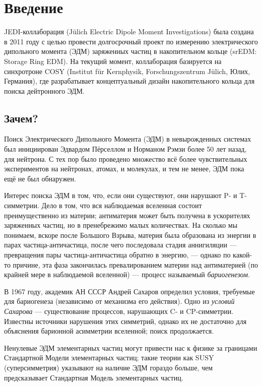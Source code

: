 \documentclass{extarticle}
\begin{document}


\tableofcontents
\pagebreak

\section*{Введение}
JEDI-коллаборация (J\"ulich Electric Dipole Moment Investigations) была создана в 2011 году с целью провести долгосрочный проект по измерению электрического дипольного момента (ЭДМ) заряженных частиц в накопительном кольце (srEDM: Storage Ring EDM). На текущий момент, коллаборация базируется на синхротроне COSY (Institut f\"ur Kernphysik, Forschungszentrum J\"ulich, Юлих, Германия), где разрабатывает концептуальный дизайн накопительного кольца для поиска дейтронного ЭДМ.

\subsection{Зачем?}
Поиск Электрического Дипольного Момента (ЭДМ) в невырожденных системах был инициирован Эдвардом Пёрселлом и Норманом Рэмзи более 50 лет назад, для нейтрона. С тех пор было проведено множество всё более чувствительных экспериментов на нейтронах, атомах, и молекулах, и тем не менее, ЭДМ пока ещё не был обнаружен. 

Интерес поиска ЭДМ в том, что, если они существуют, они нарушают P- и T-симметрии. Дело в том, что вся наблюдаемая вселенная состоит преимущественно из материи; антиматерия может быть получена в ускорителях заряженных частиц, но в пренебрежимо малых количествах. На сколько мы понимаем, вскоре после Большого Взрыва, материя была образована из энергии в парах частица-античастица, после чего последовала стадия аннигиляции --- превращения пары частица-античастица обратно в энергию, --- однако по какой-то причине, эта фаза закончилась превалированием материи над антиматерией (по крайней мере в наблюдаемой вселенной) --- процесс называемый \emph{бариогенезом.}

В 1967 году, академик АН СССР Андрей Сахаров определил условия, требуемые для бариогенеза (независимо от механизма его действия). Одно из \emph{условий Сахарова} --- существование процессов, нарушающих C- и CP-симметрии. Известны источники нарушения этих симметрий, однако их не достаточно для объяснения барионной асимметрии вселенной; поиск продолжается.

Ненулевые ЭДМ элементарных частиц могут привести нас к физике за границами Стандартной Модели элементарных частиц; такие теории как SUSY (суперсимметрия) указывают на наличие ЭДМ гораздо больше, чем предсказывает Стандартная Модель элементарных частиц.
\end{document}
